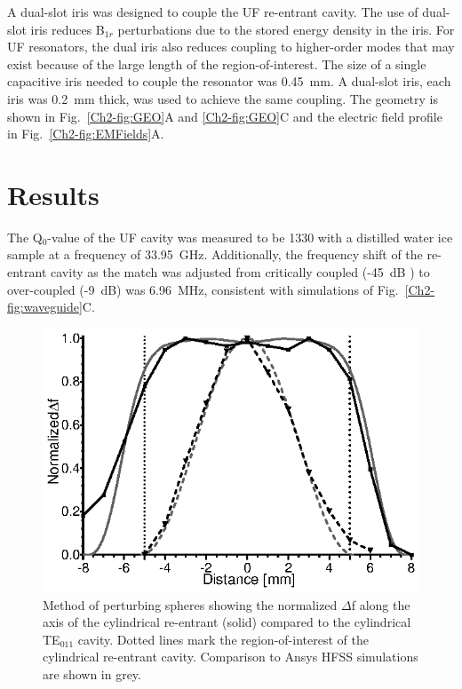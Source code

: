 A dual-slot iris was designed to couple the UF re-entrant \cylTE{} cavity. The use of dual-slot iris reduces B$_{1r}$ perturbations due to the stored energy density in the iris. For UF resonators, the dual iris also reduces coupling to higher-order modes that may exist because of the large length of the region-of-interest. \cite{UFLGR2017} The size of a single capacitive iris needed to couple the resonator was 0.45~mm. A dual-slot iris, each iris was 0.2~mm thick, was used to achieve the same coupling. The geometry is shown in Fig.~\ref{Ch2-fig:GEO}A and \ref{Ch2-fig:GEO}C and the electric field profile in Fig.~\ref{Ch2-fig:EMFields}A.

\section{Results}
The Q$_0$-value of the UF cavity was measured to be 1330 with a distilled water ice sample at a frequency of 33.95~GHz. Additionally, the frequency shift of the re-entrant \cylTE{} cavity as the match was adjusted from critically coupled (-45~dB ) to over-coupled (-9~dB) was 6.96~MHz, consistent with simulations of Fig.~\ref{Ch2-fig:waveguide}C. 

\begin{figure}[htb]\centering
 \includegraphics{Kapitel/Ch2-Images/05-TE01Uperturb.eps}
 \caption[Measured magnetic field using perturbing spheres.]{Method of perturbing spheres showing the normalized $\Delta$f along the axis of the cylindrical re-entrant \cylTE{} (solid) compared to the cylindrical TE$_{\text{011}}$ cavity. Dotted lines mark the region-of-interest of the cylindrical re-entrant \cylTE{} cavity.  Comparison to Ansys HFSS simulations are shown in grey.}
 \label{Ch2-fig:perturb}
\end{figure}

